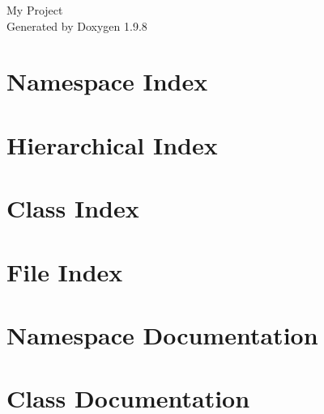 \documentclass[twoside]{book}
\newcommand{\+}{\discretionary{\mbox{\scriptsize$\hookleftarrow$}}{}{}}
\newcommand{\clearemptydoublepage}{%
    \newpage{\pagestyle{empty}\cleardoublepage}%
  }
\begin{document}
  \raggedbottom
    \hypersetup{pageanchor=false,
                bookmarksnumbered=true,
                pdfencoding=unicode
               }
  \begin{titlepage}
  \vspace*{7cm}
  \begin{center}%
  {\Large My Project}\\
  \vspace*{1cm}
  {\large Generated by Doxygen 1.9.8}\\
  \end{center}
  \end{titlepage}
  \clearemptydoublepage
  \tableofcontents
  \clearemptydoublepage
  \hypersetup{pageanchor=true}




\chapter{Namespace Index}

\chapter{Hierarchical Index}

\chapter{Class Index}

\chapter{File Index}

\chapter{Namespace Documentation}

\chapter{Class Documentation}





















\end{document}
